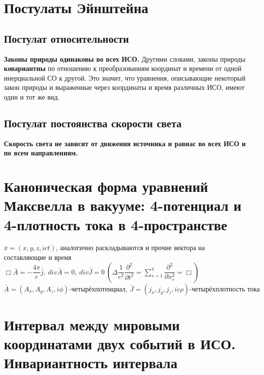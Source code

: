 \newcommand{\colontitulAutors}{edombek}
\newcommand{\colontitulYear}{2022}
\newcommand{\colontitulEducationalSubject}{СПЕЦИАЛЬНАЯ ТЕОРИЯ ОТНОСИТЕЛЬНОСТИ}
\newcommand{\colontitulTeacher}{И.~А.~Павличенко}




	\small
	\begin{multicols*}{2}
		\section{Постулаты Эйнштейна}
		
		\subsection{Постулат относительности}
		
		\textbf{Законы природы одинаковы во всех ИСО.} Другими словами, законы природы \textbf{ковариантны} по отношению к преобразованиям координат и времени от одной инерциальной СО к другой. Это значит, что уравнения, описывающие некоторый закон природы и выраженные через координаты и время различных ИСО, имеют один и тот же вид.
		
		\subsection{Постулат постоянства скорости света}
		
		\textbf{Скорость света не зависит от движения источника и равнас во всех ИСО и по всем направлениям.}
		
		\section{Каноническая форма уравнений Максвелла в вакууме: 4-потенциал и 4-плотность тока в 4-пространстве}
		
		$ \bar{x} = \left(x, y, z, ict\right) $, аналогично раскладываются и прочие вектора на составляющие и время \\
		$ \Box \bar{A} = -\dfrac{4\pi}{c}\bar{j},~ div{\bar{A}} = 0,~ div{\bar{J}} = 0~ \left(\Delta \dfrac{1}{c^2}\dfrac{\partial^2}{\partial t^2}=\sum\limits_{s=1}^4\dfrac{\partial^2}{\partial x_s^2}=\Box\right) $  \\
		$ \bar{A} = \left(A_x, A_y, A_z, i\phi\right) \text{-четырёхпотенциал},~ \bar{J} = \left(j_x, j_y, j_z, ic\rho\right) \text{-четырёхплотность тока} $
		
		\section{Интервал между мировыми координатами двух событий в ИСО. Инвариантность интервала}
		

\end{multicols*}
